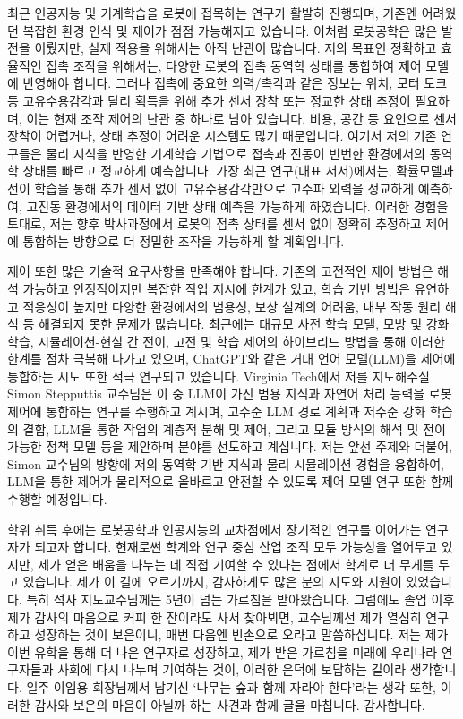 \documentclass{article}
\begin{document}
최근 인공지능 및 기계학습을 로봇에 접목하는 연구가 활발히 진행되며, 기존엔 어려웠던 복잡한 환경 인식 및 제어가 점점 가능해지고 있습니다. 이처럼 로봇공학은 많은 발전을 이뤘지만, 실제 적용을 위해서는 아직 난관이 많습니다. 저의 목표인 정확하고 효율적인 접촉 조작을 위해서는, 다양한 로봇의 접촉 동역학 상태를 통합하여 제어 모델에 반영해야 합니다. 그러나 접촉에 중요한 외력/촉각과 같은 정보는 위치, 모터 토크 등 고유수용감각과 달리 획득을 위해 추가 센서 장착 또는 정교한 상태 추정이 필요하며, 이는 현재 조작 제어의 난관 중 하나로 남아 있습니다. 비용, 공간 등 요인으로 센서 장착이 어렵거나, 상태 추정이 어려운 시스템도 많기 때문입니다. 여기서 저의 기존 연구들은 물리 지식을 반영한 기계학습 기법으로 접촉과 진동이 빈번한 환경에서의 동역학 상태를 빠르고 정교하게 예측합니다. 가장 최근 연구(대표 저서)에서는, 확률모델과 전이 학습을 통해 추가 센서 없이 고유수용감각만으로 고주파 외력을 정교하게 예측하여, 고진동 환경에서의 데이터 기반 상태 예측을 가능하게 하였습니다. 이러한 경험을 토대로, 저는 향후 박사과정에서 로봇의 접촉 상태를 센서 없이 정확히 추정하고 제어에 통합하는 방향으로 더 정밀한 조작을 가능하게 할 계획입니다.

제어 또한 많은 기술적 요구사항을 만족해야 합니다. 기존의 고전적인 제어 방법은 해석 가능하고 안정적이지만 복잡한 작업 지시에 한계가 있고, 학습 기반 방법은 유연하고 적응성이 높지만 다양한 환경에서의 범용성, 보상 설계의 어려움, 내부 작동 원리 해석 등 해결되지 못한 문제가 많습니다. 최근에는 대규모 사전 학습 모델, 모방 및 강화 학습, 시뮬레이션-현실 간 전이, 고전 및 학습 제어의 하이브리드 방법을 통해 이러한 한계를 점차 극복해 나가고 있으며, ChatGPT와 같은 거대 언어 모델(LLM)을 제어에 통합하는 시도 또한 적극 연구되고 있습니다. Virginia Tech에서 저를 지도해주실 Simon Stepputtis 교수님은 이 중 LLM이 가진 범용 지식과 자연어 처리 능력을 로봇 제어에 통합하는 연구를 수행하고 계시며, 고수준 LLM 경로 계획과 저수준 강화 학습의 결합, LLM을 통한 작업의 계층적 분해 및 제어, 그리고 모듈 방식의 해석 및 전이 가능한 정책 모델 등을 제안하며 분야를 선도하고 계십니다. 저는 앞선 주제와 더불어, Simon 교수님의 방향에 저의 동역학 기반 지식과 물리 시뮬레이션 경험을 융합하여, LLM을 통한 제어가 물리적으로 올바르고 안전할 수 있도록 제어 모델 연구 또한 함께 수행할 예정입니다.

학위 취득 후에는 로봇공학과 인공지능의 교차점에서 장기적인 연구를 이어가는 연구자가 되고자 합니다. 현재로썬 학계와 연구 중심 산업 조직 모두 가능성을 열어두고 있지만, 제가 얻은 배움을 나누는 데 직접 기여할 수 있다는 점에서 학계로 더 무게를 두고 있습니다. 제가 이 길에 오르기까지, 감사하게도 많은 분의 지도와 지원이 있었습니다. 특히 석사 지도교수님께는 5년이 넘는 가르침을 받아왔습니다. 그럼에도 졸업 이후 제가 감사의 마음으로 커피 한 잔이라도 사서 찾아뵈면, 교수님께선 제가 열심히 연구하고 성장하는 것이 보은이니, 매번 다음엔 빈손으로 오라고 말씀하십니다. 저는 제가 이번 유학을 통해 더 나은 연구자로 성장하고, 제가 받은 가르침을 미래에 우리나라 연구자들과 사회에 다시 나누며 기여하는 것이, 이러한 은덕에 보답하는 길이라 생각합니다. 일주 이임용 회장님께서 남기신 ‘나무는 숲과 함께 자라야 한다’라는 생각 또한, 이러한 감사와 보은의 마음이 아닐까 하는 사견과 함께 글을 마칩니다. 감사합니다.
\end{document}
